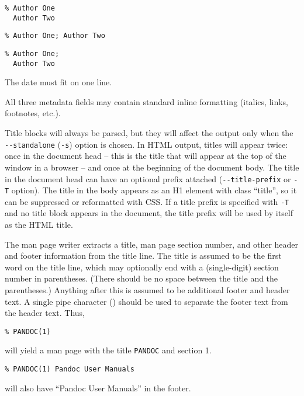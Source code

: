 \documentclass[
]{article}
\begin{document}
\begin{verbatim}
% Author One
  Author Two
\end{verbatim}

\begin{verbatim}
% Author One; Author Two
\end{verbatim}

\begin{verbatim}
% Author One;
  Author Two
\end{verbatim}

The date must fit on one line.

All three metadata fields may contain standard inline formatting
(italics, links, footnotes, etc.).

Title blocks will always be parsed, but they will affect the output only
when the \texttt{-\/-standalone} (\texttt{-s}) option is chosen. In HTML
output, titles will appear twice: once in the document head -- this is
the title that will appear at the top of the window in a browser -- and
once at the beginning of the document body. The title in the document
head can have an optional prefix attached (\texttt{-\/-title-prefix} or
\texttt{-T} option). The title in the body appears as an H1 element with
class ``title'', so it can be suppressed or reformatted with CSS. If a
title prefix is specified with \texttt{-T} and no title block appears in
the document, the title prefix will be used by itself as the HTML title.

The man page writer extracts a title, man page section number, and other
header and footer information from the title line. The title is assumed
to be the first word on the title line, which may optionally end with a
(single-digit) section number in parentheses. (There should be no space
between the title and the parentheses.) Anything after this is assumed
to be additional footer and header text. A single pipe character
(\texttt{\textbar{}}) should be used to separate the footer text from
the header text. Thus,

\begin{verbatim}
% PANDOC(1)
\end{verbatim}

will yield a man page with the title \texttt{PANDOC} and section 1.

\begin{verbatim}
% PANDOC(1) Pandoc User Manuals
\end{verbatim}

will also have ``Pandoc User Manuals'' in the footer.
\end{document}

